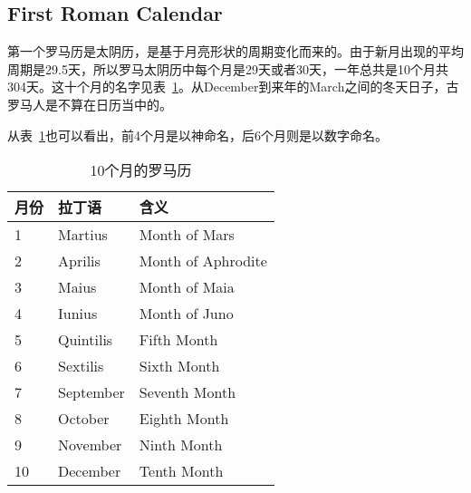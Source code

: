 \subsection{First Roman Calendar}
\label{sec:first-roman-calendar}
第一个罗马历是太阴历，是基于月亮形状的周期变化而来的。由于新月出现的平均周期是29.5天，所以罗马太阴历中每个月是29天或者30天，一年总共是10个月共304天。这十个月的名字见表~\ref{tab:10-months-of-roman-calendar}。从December到来年的March之间的冬天日子，古罗马人是不算在日历当中的。

从表~\ref{tab:10-months-of-roman-calendar}也可以看出，前4个月是以神命名，后6个月则是以数字命名。


\begin{table}[htbp]
  \centering
  \caption{10个月的罗马历}
  \label{tab:10-months-of-roman-calendar}
  \begin{minipage}{\textwidth}  %
  \centering
  \begin{tabular}{lll}
    \toprule
    月份 & 拉丁语    & 含义               \\\midrule
    1    & Martius   & Month of Mars      \\
    2    & Aprilis   & Month of Aphrodite \\
    3    & Maius     & Month of Maia      \\
    4    & Iunius    & Month of Juno      \\
    5    & Quintilis & Fifth Month        \\
    6    & Sextilis  & Sixth Month        \\
    7    & September & Seventh Month      \\
    8    & October   & Eighth Month       \\
    9    & November  & Ninth Month        \\
    10   & December  & Tenth Month        \\
    \bottomrule
  \end{tabular}
  \end{minipage}
\end{table}

